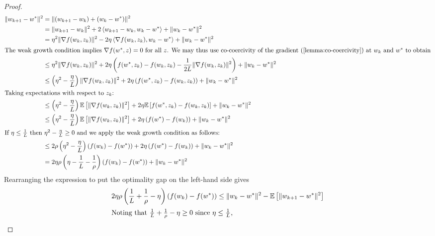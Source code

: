 \iffalse
\begin{proof}
   \begin{align*}
       \norm{\wkk - \wopt}^2 &= \norm{(\wkk - \wk) + (\wk - \wopt)}^2\\
                             &= \norm{\wkk - \wk}^2 + 2 \abr{\wkk - \wk, \wk - \wopt} + \norm{\wk - \wopt}^2\\
                             &= \eta^2 \norm{\grad(\wk, \zk)}^2 - 2 \eta \abr{\grad(\wk, \zk), \wk - \wopt} + \norm{\wk - \wopt}^2\\ 
                             \intertext{The weak growth condition implies \( \grad(\wopt, \z) = 0 \) for all \( \z \). We may thus use co-coercivity of the gradient (\autoref{lemma:co-coercivity}) at \( \wk \) and \( \wopt \) to obtain}
                             &\leq \eta^2 \norm{\grad(\wk, \zk)}^2 + 2 \eta \rbr{f(\wopt, \zk) - f(\wk, \zk) - \frac{1}{2L} \norm{\grad(\wk, \zk)}^2}  + \norm{\wk - \wopt}^2\\ 
                             &\leq \rbr{\eta^2 - \frac{\eta}{L}} \norm{\grad(\wk, \zk)}^2 + 2 \eta \rbr{f(\wopt, \zk) - f(\wk, \zk)} + \norm{\wk - \wopt}^2\\
                             \intertext{Taking expectations with respect to \( \zk \):}
                             &\leq \rbr{\eta^2 - \frac{\eta}{L}} \E \sbr{\norm{\grad(\wk, \zk)}^2} + 2 \eta \E\sbr{f(\wopt, \zk) - f(\wk, \zk)} + \norm{\wk - \wopt}^2\\
                             &\leq \rbr{\eta^2 - \frac{\eta}{L}} \E \sbr{\norm{\grad(\wk, \zk)}^2} + 2 \eta \rbr{f(\wopt) - f(\wk)} + \norm{\wk - \wopt}^2\\
                             \intertext{If \( \eta \leq \frac{1}{L} \) then \( \eta^2 - \frac{\eta}{L} \geq 0 \) and we apply the weak growth condition as follows: }
                             &\leq 2 \rho \rbr{\eta^2- \frac{\eta}{L}}\rbr{\f(\wk) - f(\wopt)} + 2 \eta\rbr{f(\wopt) - f(\wk)} + \norm{\wk - \wopt}^2\\ 
                             &= 2\eta \rho \rbr{\eta - \frac{1}{L} - \frac{1}{\rho}}\rbr{f(\wk) - f(\wopt)} + \norm{\wk - \wopt}^2
\end{align*}
Rearranging the expression to put the optimality gap on the left-hand side gives
\begin{align*}
    2 \eta \rho \rbr{\frac{1}{L} + \frac{1}{\rho} - \eta}\rbr{f(\wk) - f(\wopt)} &\leq \norm{\wk - \wopt}^2 - \E\sbr{\norm{\wkk - \wopt}^2}\\ 
\intertext{Noting that \( \frac{1}{L} + \frac{1}{\rho} - \eta \geq 0 \) since \( \eta \leq \frac{1}{L} \), }

\end{align*}
\end{proof}

